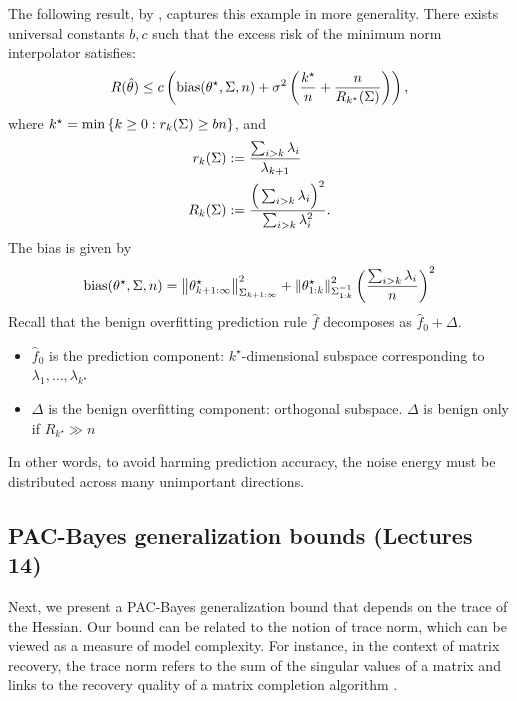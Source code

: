 The following result, by \citet{bartlett2020benign}, captures this example in more generality.
There exists universal constants $b, c$ such that the excess risk of the minimum norm interpolator satisfies:
\[ R(\hat \theta) \le c \left( \textup{bias}(\theta^{\star}, \Sigma, n) + \sigma^2 \left( \frac {k^{\star}} {n } + \frac n {R_{k^{\star}}(\Sigma)} \right) \right), \]
where $k^{\star} = \min \left\{k \ge 0 : r_k(\Sigma) \ge bn\right\}$, and
\begin{align*}
    r_k(\Sigma) &:= \frac {\sum_{i > k} \lambda_i } {\lambda_{k+1}} \\
    R_k(\Sigma) &:= \frac {\Big(\sum_{i > k} \lambda_i\Big)^2} {\sum_{i > k} \lambda_i^2}.
\end{align*}
The bias is given by
\begin{align*}
    \textup{\textup{bias}}(\theta^{\star}, \Sigma, n)
    = \left\| \theta^{\star}_{k+1 : \infty} \right\|_{\Sigma_{k+1 : \infty}}^2 + \left\| \theta^{\star}_{1 : k} \right\|^2_{\Sigma^{-1}_{1 : k}} \left( \frac {\sum_{i > k} \lambda_i} n \right)^2
\end{align*}
Recall that the benign overfitting prediction rule $\hat f$ decomposes as $\hat f_0 + \Delta$.
\begin{itemize}
    \item $\hat f_0$ is the prediction component: $k^{\star}$-dimensional subspace corresponding to $\lambda_1, \dots, \lambda_{k^{\star}}$

    \item $\Delta$ is the benign overfitting component: orthogonal subspace.
    $\Delta$ is benign only if $R_{k^{\star}} \gg n$
\end{itemize}
In other words, to avoid harming prediction accuracy, the noise energy must be distributed across many unimportant directions.

\subsection{PAC-Bayes generalization bounds (Lectures 14)}

Next, we present a PAC-Bayes generalization bound that depends on the trace of the Hessian.
Our bound can be related to the notion of trace norm, which can be viewed as a measure of model complexity.
For instance, in the context of matrix recovery, the trace norm refers to the sum of the singular values of a matrix and links to the recovery quality of a matrix completion algorithm \citep{srebro2005rank}.

